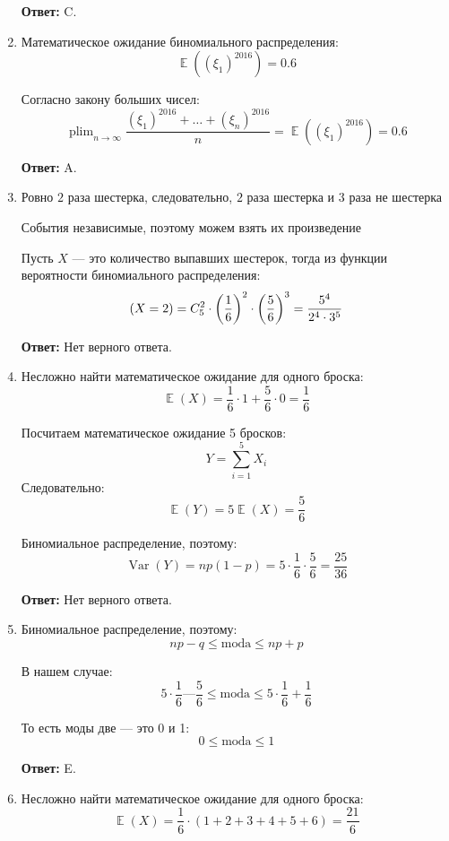 \documentclass[a4paper]{article} %
\DeclareMathOperator*\plim{plim}
\DeclareMathOperator{\Var}{Var}
\DeclareMathOperator{\E}{\mathbb{E}}
\let\P\relax
\DeclareMathOperator{\P}{\mathbb{P}}
\renewcommand{\leq}{\leqslant}
\begin{document}
\begin{enumerate}
    \textbf{Ответ:} C.
    
    
    \item
    Математическое ожидание биномиального распределения:
    \[
    \E((\xi_1)^{2016}) = 0.6
    \]
    
    Согласно закону больших чисел:
    \[
    \plim_{n\to\infty} \frac{(\xi_1)^{2016} + \ldots + (\xi_n)^{2016}}{n} = \E((\xi_1)^{2016}) = 0.6
    \]
    
    \textbf{Ответ:} A.
    
    
    \item
    Ровно $2$ раза шестерка, следовательно, $2$ раза шестерка и  $3$ раза не шестерка
    
    События независимые, поэтому можем взять их произведение
    
    Пусть $X$ — это количество выпавших шестерок, тогда из функции вероятности биномиального распределения:
    \[
    \P(X=2) = C_5^2 \cdot\left(\frac{1}{6}\right)^2 \cdot \left(\frac{5}{6}\right)^3 = \frac{5^4}{2^4\cdot3^5}
    \]
    
    \textbf{Ответ:} Нет верного ответа.
    
    
    \item
    Несложно найти математическое ожидание для одного броска:
    \[
    \E(X) = \frac{1}{6}\cdot1 + \frac{5}{6}\cdot0 = \frac{1}{6}
    \]
    
    Посчитаем математическое ожидание 5 бросков:
    \[
    Y = \sum_{i=1}^{5} X_i 
    \]
    Следовательно:
    \[
    \E(Y) = 5\E(X) = \frac{5}{6}
    \]
    
    Биномиальное распределение, поэтому:
    \[
    \Var(Y) = np(1-p) = 5 \cdot \frac{1}{6} \cdot \frac{5}{6} = \frac{25}{36}
    \]
    
    \textbf{Ответ:} Нет верного ответа.
    
    
    \item
    Биномиальное распределение, поэтому:
    \[
    np-q \leq \text{moda} \leq np+p
    \]
    
    В нашем случае:
    \[
    5 \cdot \frac{1}{6} — \frac{5}{6} \leq \text{moda} \leq 5 \cdot \frac{1}{6} + \frac{1}{6}
    \]
    
    То есть моды две — это 0 и 1:
    \[
    0 \leq \text{moda} \leq 1
    \]
    
    \textbf{Ответ:} E.
    
    
    \item
    Несложно найти математическое ожидание для одного броска:
    \[
    \E(X) = \frac{1}{6}\cdot(1 + 2 + 3 + 4 + 5 + 6) = \frac{21}{6}
    \]
    

\end{enumerate}
\end{document}
